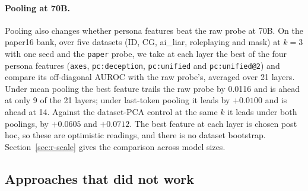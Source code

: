 \paragraph{Pooling at 70B.}
Pooling also changes whether persona features beat the raw probe at 70B.
On the paper16 bank, over five datasets (ID, CG, ai\_liar, roleplaying and mask) at $k=3$ with one seed and the \texttt{paper} probe, we take at each layer the best of the four persona features (\texttt{axes}, \texttt{pc:deception}, \texttt{pc:unified} and \texttt{pc:unified@2}) and compare its off-diagonal AUROC with the raw probe's, averaged over 21 layers. %
Under mean pooling the best feature trails the raw probe by 0.0116 and is ahead at only 9 of the 21 layers; under last-token pooling it leads by $+0.0100$ and is ahead at 14. %
Against the dataset-PCA control at the same $k$ it leads under both poolings, by $+0.0605$ and $+0.0712$. %
The best feature at each layer is chosen post hoc, so these are optimistic readings, and there is no dataset bootstrap. %
Section~\ref{sec:r-scale} gives the comparison across model sizes.

\subsection{Approaches that did not work}
\label{sec:r-failed}

